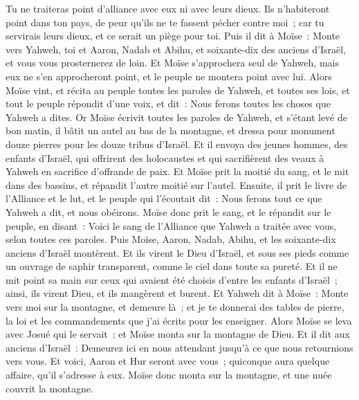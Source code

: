 \begin{multicols}{2}
Tu ne traiteras point d'alliance avec eux ni avec leurs dieux.
Ils n'habiteront point dans ton pays, de peur qu'ils ne te fassent pécher contre moi~; car tu servirais leurs dieux, et ce serait un piège pour toi.
\VerseOne{}Puis il dit à Moïse~: Monte vers Yahweh, toi et Aaron, Nadab et Abihu, et soixante-dix des anciens d'Israël, et vous vous prosternerez de loin.
Et Moïse s'approchera seul de Yahweh, mais eux ne s'en approcheront point, et le peuple ne montera point avec lui.
Alors Moïse vint, et récita au peuple toutes les paroles de Yahweh, et toutes ses lois, et tout le peuple répondit d'une voix, et dit~: Nous ferons toutes les choses que Yahweh a dites.
Or Moïse écrivit toutes les paroles de Yahweh, et s'étant levé de bon matin, il bâtit un autel au bas de la montagne, et dressa pour monument douze pierres pour les douze tribus d'Israël.
Et il envoya des jeunes hommes, des enfants d'Israël, qui offrirent des holocaustes et qui sacrifièrent des veaux à Yahweh en sacrifice d'offrande de paix.
Et Moïse prit la moitié du sang, et le mit dans des bassins, et répandit l'autre moitié sur l'autel.
Ensuite, il prit le livre de l'Alliance et le lut, et le peuple qui l'écoutait dit~: Nous ferons tout ce que Yahweh a dit, et nous obéirons.
Moïse donc prit le sang, et le répandit sur le peuple, en disant~: Voici le sang de l'Alliance que Yahweh a traitée avec vous, selon toutes ces paroles.
Puis Moïse, Aaron, Nadab, Abihu, et les soixante-dix anciens d'Israël montèrent.
Et ils virent le Dieu d'Israël, et sous ses pieds comme un ouvrage de saphir transparent, comme le ciel dans toute sa pureté.
Et il ne mit point sa main sur ceux qui avaient été choisis d'entre les enfants d'Israël~; ainsi, ils virent Dieu, et ils mangèrent et burent.
Et Yahweh dit à Moïse~: Monte vers moi sur la montagne, et demeure là~; et je te donnerai des tables de pierre, la loi et les commandements que j'ai écrits pour les enseigner.
Alors Moïse se leva avec Josué qui le servait~; et Moïse monta sur la montagne de Dieu.
Et il dit aux anciens d'Israël~: Demeurez ici en nous attendant jusqu'à ce que nous retournions vers vous. Et voici, Aaron et Hur seront avec vous~; quiconque aura quelque affaire, qu'il s'adresse à eux.
Moïse donc monta sur la montagne, et une nuée couvrit la montagne.

\end{multicols}
